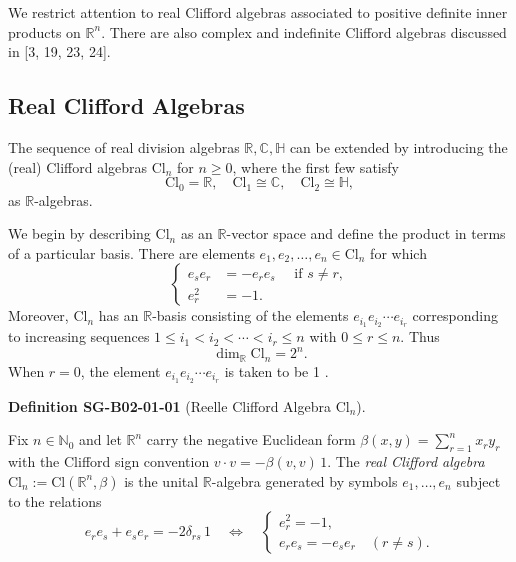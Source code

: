 \documentclass[10pt, letterpaper]{article}
\newcommand{\R}{\mathbb{R}}
\newcommand{\Cl}{\mathrm{Cl}}
\newcommand{\CustomHeading}[3]{%
  \par\medskip\noindent%
  \textbf{#1 #2} \textnormal{(#3)}.\enskip%
}
\newenvironment{DEF}[2]{\begin{unitbox}\CustomHeading{Definition}{#1}{#2}}{\end{unitbox}}
\begin{document}
We restrict attention to real Clifford algebras associated to positive definite inner products on $\mathbb{R}^{n}$. There are also complex and indefinite Clifford algebras discussed in [3, 19, 23, 24].

\subsection{Real Clifford Algebras}


The sequence of real division algebras $\mathbb{R}, \mathbb{C}, \mathbb{H}$ can be extended by introducing the (real) Clifford algebras $\mathrm{Cl}_{n}$ for $n \geqslant 0$, where the first few satisfy
$$
\mathrm{Cl}_{0}=\mathbb{R}, \quad \mathrm{Cl}_{1} \cong \mathbb{C}, \quad \mathrm{Cl}_{2} \cong \mathbb{H},
$$
as $\mathbb{R}$-algebras.

We begin by describing $\mathrm{Cl}_{n}$ as an $\mathbb{R}$-vector space and define the product in terms of a particular basis. There are elements $e_{1}, e_{2}, \ldots, e_{n} \in \mathrm{Cl}_{n}$ for which
$$
\left\{\begin{aligned}
e_{s} e_{r} & =-e_{r} e_{s} \quad \text { if } s \neq r, \\
e_{r}^{2} & =-1 .
\end{aligned}\right.
$$
Moreover, $\mathrm{Cl}_{n}$ has an $\mathbb{R}$-basis consisting of the elements $e_{i_{1}} e_{i_{2}} \cdots e_{i_{r}}$ corresponding to increasing sequences $1 \leqslant i_{1}<i_{2}<\cdots<i_{r} \leqslant n$ with $0 \leqslant r \leqslant n$. Thus
$$
\operatorname{dim}_{\mathbb{R}} \mathrm{Cl}_{n}=2^{n} .
$$
When $r=0$, the element $e_{i_{1}} e_{i_{2}} \cdots e_{i_{r}}$ is taken to be 1 .




\begin{DEF}{SG-B02-01-01}{Reelle Clifford Algebra \(\Cl_n\)}
Fix \(n\in\mathbb{N}_0\) and let \(\R^n\) carry the negative Euclidean form
\(\beta(x,y)=\sum_{r=1}^n x_r y_r\) with the Clifford sign convention
\(v\cdot v=-\beta(v,v)\,1\).
The \emph{real Clifford algebra} \(\Cl_n:=\Cl(\R^n,\beta)\) is the unital
\(\R\)-algebra generated by symbols \(e_1,\dots,e_n\) subject to the relations
\[
e_r e_s+e_s e_r=-2\delta_{rs}\,1
\quad\Longleftrightarrow\quad
\begin{cases}
e_r^2=-1,\\
e_r e_s=-e_s e_r\quad(r\neq s).
\end{cases}
\]
\end{DEF}
\end{document}
